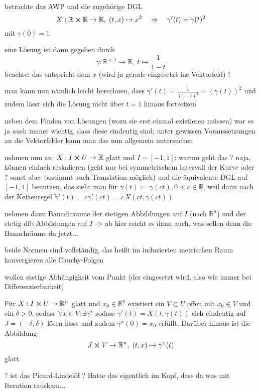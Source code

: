 \documentclass[../H_Analysis_main.tex]{subfiles}
\begin{document}
\begin{bsp}
betrachte das AWP und die zugehörige DGL
\begin{equation}
X: \mathbb{R} \cross \mathbb{R} \rightarrow \mathbb{R}, \; (t, x) \mapsto x^2 \quad \Rightarrow \quad \gamma'(t) = \gamma(t)^2
\end{equation}
mit $\gamma(0) = 1$

eine Lösung ist dann gegeben durch
\begin{equation}
\gamma: \mathbb{R}^{< 1} \rightarrow \mathbb{R}, \; t \mapsto \frac{1}{1 - t}
\end{equation}
beachte: das entspricht dem $x$ (wird ja gerade eingesetzt ins Vektorfeld) !

man kann nun nämlich leicht berechnen, dass $\gamma'(t) = \frac{1}{(1 - t)^2} = (\gamma(t))^2$ und zudem lässt sich die Lösung nicht über $t = 1$ hinaus fortsetzen
\end{bsp}


neben dem Finden von Lösungen (wozu sie erst einmal existieren müssen) war es ja auch immer wichtig, dass diese eindeutig sind; unter gewissen Voraussetzungen an die Vektorfelder kann man das nun allgemein untersuchen

nehmen nun an: $X: I \cross U \rightarrow \mathbb{R}$ glatt und $I = [-1, 1]$; warum geht das ? naja, können einfach reskalieren (geht nur bei symmetrischem Intervall der Kurve oder ? sonst aber bestimmt auch Translation möglich) und die äquivalente DGL auf $[-1, 1]$ benutzen, das sieht man für $\tilde{\gamma}(t) := \gamma(ct), 0 < c \in \mathbb{R}$, weil dann nach der Kettenregel $\tilde{\gamma}'(t) = c \gamma'(c t) = c \, X(ct, \gamma(ct))$

nehmen dann Banachräume der stetigen Abbildungen auf $I$ (nach $\mathbb{R}^n$) und der stetig dfb Abbildungen auf $I$ -> ab hier reicht es dann auch, was sollen denn die Banachräume da jetzt...

beide Normen sind vollständig, das heißt im induzierten metrischen Raum konvergieren alle Cauchy-Folgen

wollen stetige Abhängigkeit vom Punkt (der eingesetzt wird, also wie immer bei Differenzierbarkeit)

\begin{satz}\label{satz:loesgdglreell}
Für $X: I \cross U \rightarrow \mathbb{R}^n$ glatt und $x_0 \in \mathbb{R}^n$ existiert ein $V \subset U$ offen mit $x_0 \in V$ und ein $\delta > 0$, sodass $\forall x \in V: \exists \gamma^x$ sodass $\gamma'(t) = X(t, \gamma(t))$ sich eindeutig auf $J = (-\delta, \delta)$ lösen lässt und zudem $\gamma^x(0) = x_0$ erfüllt. Darüber hinaus ist die Abbildung
\begin{equation}
J \cross V \rightarrow \mathbb{R}^n, \; (t, x) \mapsto \gamma^x(t)
\end{equation}
glatt.
\end{satz}
? ist das Picard-Lindelöf ? Hatte das eigentlich im Kopf, dass da was mit Iteration rauskam...
\end{document}

